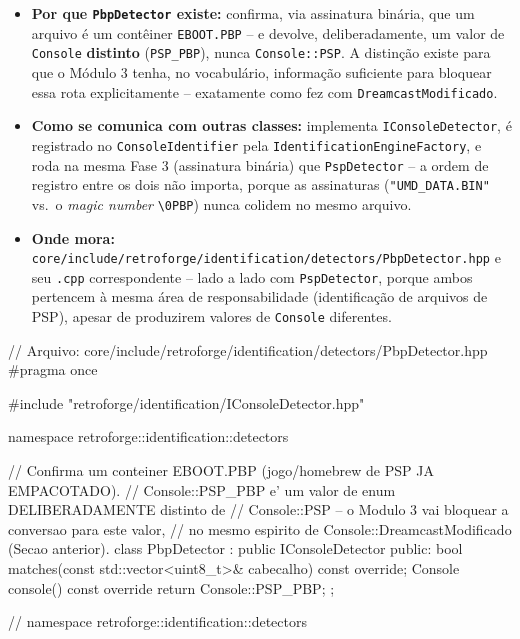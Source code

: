\begin{itemize}
    \item \textbf{Por que \texttt{PbpDetector} existe:} confirma, via assinatura binária, que um arquivo é um contêiner \texttt{EBOOT.PBP} -- e devolve, deliberadamente, um valor de \texttt{Console} \textbf{distinto} (\texttt{PSP\_PBP}), nunca \texttt{Console::PSP}. A distinção existe para que o Módulo 3 tenha, no vocabulário, informação suficiente para bloquear essa rota explicitamente -- exatamente como fez com \texttt{DreamcastModificado}.
    \item \textbf{Como se comunica com outras classes:} implementa \texttt{IConsoleDetector}, é registrado no \texttt{ConsoleIdentifier} pela \texttt{IdentificationEngineFactory}, e roda na mesma Fase 3 (assinatura binária) que \texttt{PspDetector} -- a ordem de registro entre os dois não importa, porque as assinaturas (\texttt{"UMD\_DATA.BIN"} vs.\ o \textit{magic number} \texttt{\textbackslash 0PBP}) nunca colidem no mesmo arquivo.
    \item \textbf{Onde mora:} \texttt{core/include/retroforge/identification/detectors/PbpDetector.hpp} e seu \texttt{.cpp} correspondente -- lado a lado com \texttt{PspDetector}, porque ambos pertencem à mesma área de responsabilidade (identificação de arquivos de PSP), apesar de produzirem valores de \texttt{Console} diferentes.
\end{itemize}

\begin{CaixaCodigo}
// Arquivo: core/include/retroforge/identification/detectors/PbpDetector.hpp
#pragma once

#include "retroforge/identification/IConsoleDetector.hpp"

namespace retroforge::identification::detectors {

// Confirma um conteiner EBOOT.PBP (jogo/homebrew de PSP JA EMPACOTADO).
// Console::PSP_PBP e' um valor de enum DELIBERADAMENTE distinto de
// Console::PSP -- o Modulo 3 vai bloquear a conversao para este valor,
// no mesmo espirito de Console::DreamcastModificado (Secao anterior).
class PbpDetector : public IConsoleDetector {
public:
    bool matches(const std::vector<uint8_t>& cabecalho) const override;
    Console console() const override { return Console::PSP_PBP; }
};

} // namespace retroforge::identification::detectors
\end{CaixaCodigo}


